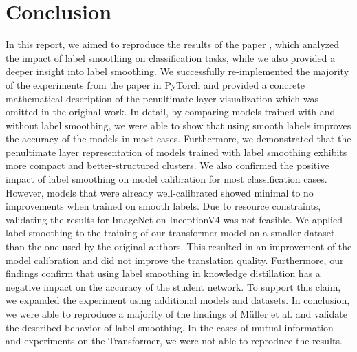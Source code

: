 \section{Conclusion}
In this report, we aimed to reproduce the results of the paper \cite{mueller2019}, which analyzed the impact of label smoothing on classification tasks, while we also provided a deeper insight into label smoothing.
We successfully re-implemented the majority of the experiments from the paper in PyTorch and provided a concrete mathematical description of the penultimate layer visualization which was omitted in the original work.
In detail, by comparing models trained with and without label smoothing, we were able to show that using smooth labels improves the accuracy of the models in most cases.
Furthermore, we demonstrated that the penultimate layer representation of models trained with label smoothing exhibits more compact and better-structured clusters.
We also confirmed the positive impact of label smoothing on model calibration for most classification cases. However, models that were already well-calibrated showed minimal to no improvements when trained on smooth labels. Due to resource constraints, validating the results for ImageNet on InceptionV4 was not feasible.
We applied label smoothing to the training of our transformer model on a smaller dataset than the one used by the original authors.
This resulted in an improvement of the model calibration and did not improve the translation quality.
Furthermore, our findings confirm that using label smoothing in knowledge distillation has a negative impact on the accuracy of the student network. To support this claim, we expanded the experiment using additional models and datasets.
In conclusion, we were able to reproduce a majority of the findings of Müller et al. \cite{mueller2019} and validate the described behavior of label smoothing. In the cases of mutual information and experiments on the Transformer, we were not able to reproduce the results. 